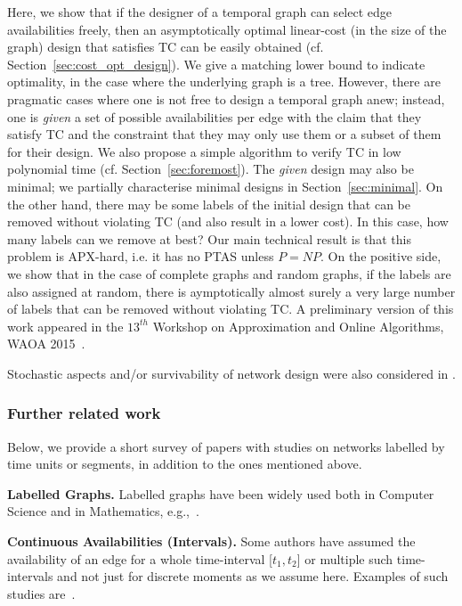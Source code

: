 \documentclass[a4paper,UKenglish]{article}
\begin{document}
Here, we show that if the designer of a temporal graph can select edge availabilities freely, then an asymptotically optimal linear-cost (in the size of the graph) design that satisfies TC can be easily obtained (cf. Section~\ref{sec:cost_opt_design}). We give a matching lower bound to indicate optimality, in the case where the underlying graph is a tree. However, there are pragmatic cases where one is not free to design a temporal graph anew; instead, one is \emph{given} a set of possible availabilities per edge with the claim that they satisfy TC and the constraint that they may only use them or a subset of them for their design. We also propose a simple algorithm to verify TC in low polynomial time (cf. Section~\ref{sec:foremost}). The \emph{given} design may also be minimal; we partially characterise minimal designs in Section~\ref{sec:minimal}. On the other hand, there may be some labels of the initial design that can be removed without violating TC (and also result in a lower cost). In this case, how many labels can we remove at best? Our main technical result is that this problem is APX-hard, i.e. it has no PTAS unless $P=NP$. On the positive side, we show that in the case of complete graphs and random graphs, if the labels are also assigned at random, there is aymptotically almost surely a very large number of labels that can be removed without violating TC. A preliminary version of this work appeared in the $13^{th}$ Workshop on Approximation and Online Algorithms, WAOA 2015~\cite{akrida-waoa}.

Stochastic aspects and/or survivability of network design were also considered in \cite{gupta,lap1, lap2}.


\subsubsection{Further related work}
Below, we provide a short survey of papers with studies on networks labelled by time units or segments, in addition to the ones mentioned above.
	
\noindent \textbf{Labelled Graphs.} Labelled graphs have been widely used both in Computer Science and in Mathematics, e.g.,~\cite{molloy}. 

\noindent \textbf{Continuous Availabilities (Intervals).} Some authors have assumed the availability of an edge for a whole time-interval [$t_1,t_2$] or multiple such time-intervals and not just for discrete moments as we assume here. Examples of such studies are~\cite{xuan, tardos, akrida-algo}.
\end{document}
